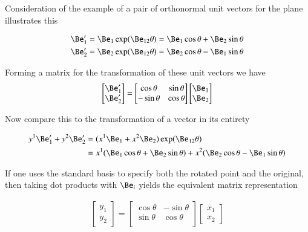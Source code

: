 Consideration of the example of a pair of orthonormal unit vectors for the plane illustrates this

\begin{align*}
\Be_1' &= \Be_1 \exp(\Be_{12}\theta) = \Be_1 \cos\theta + \Be_2 \sin\theta \\
\Be_2' &= \Be_2 \exp(\Be_{12}\theta) = \Be_2 \cos\theta - \Be_1 \sin\theta \\
\end{align*}

Forming a matrix for the transformation of these unit vectors we have
\begin{align*}
\begin{bmatrix}
\Be_1' \\
\Be_2'
\end{bmatrix}
=
\begin{bmatrix}
\cos\theta & \sin\theta \\
- \sin\theta & \cos\theta \\
\end{bmatrix}
\begin{bmatrix}
\Be_1 \\
\Be_2
\end{bmatrix}
\end{align*}

Now compare this to the transformation of a vector in its entirety

\begin{align*}
y^1 \Be_1' + y^2 \Be_2'
&= ( x^1 \Be_1 + x^2 \Be_2 ) \exp(\Be_{12}\theta) \\
&= x^1(\Be_1 \cos\theta + \Be_2 \sin\theta) 
 + x^2(\Be_2 \cos\theta - \Be_1 \sin\theta) \\
\end{align*}

If one uses the standard basis to specify both the rotated point and 
the original, then taking dot products with $\Be_i$ yields the 
equivalent matrix representation

\begin{align}\label{eqn:sphericalPolar:planeRotationAppliedToCoordinates}
\begin{bmatrix}
y_1 \\
y_2
\end{bmatrix}
=
\begin{bmatrix}
\cos\theta & -\sin\theta \\
\sin\theta & \cos\theta \\
\end{bmatrix}
\begin{bmatrix}
x_1 \\
x_2
\end{bmatrix}
\end{align}


